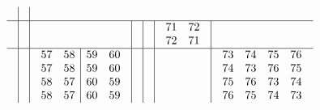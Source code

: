 \documentclass[12pt,a4paper]{amsart}
\begin{document}
\begin{align*}
\begin{array}{c|c|c|c|c|c|c}
\begin{array}{rr}
\end{array}%
& \\\hline
&&&&&
\begin{array}{rr}%
71&72\\%
72&71\\%
\end{array}%
\\\hline
&&
\begin{array}{rr|rr}%
57&58&59&60\\%
57&58&59&60\\%
58&57&60&59\\%
58&57&60&59\\%
\end{array}%
&&&&
\begin{array}{rrrr}%
73&74&75&76\\%
74&73&76&75\\%
75&76&73&74\\%
76&75&74&73\\%
\end{array}%
\end{array}
\end{align*}
\end{document}

